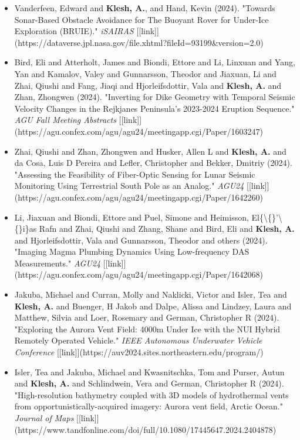 \documentclass[11pt,letterpaper]{article}
\begin{document}
\begin{itemize}
\item Vanderfeen, Edward and \textbf{Klesh, A.}, and Hand, Kevin (2024). "Towards Sonar-Based Obstacle Avoidance for The Buoyant Rover for Under-Ice Exploration (BRUIE)." \textit{iSAIRAS} [[link]](https://dataverse.jpl.nasa.gov/file.xhtml?fileId=93199\&version=2.0)
\item Bird, Eli and Atterholt, James and Biondi, Ettore and Li, Linxuan and Yang, Yan and Kamalov, Valey and Gunnarsson, Theodor and Jiaxuan, Li and Zhai, Qiushi and Fang, Jiaqi and Hjorleifsdottir, Vala and \textbf{Klesh, A.} and Zhan, Zhongwen (2024). "Inverting for Dike Geometry with Temporal Seismic Velocity Changes in the Rejkjanes Peninsula's 2023-2024 Eruption Sequence." \textit{AGU Fall Meeting Abstracts} [[link]](https://agu.confex.com/agu/agu24/meetingapp.cgi/Paper/1603247)
\item Zhai, Qiushi and Zhan, Zhongwen and Husker, Allen L and \textbf{Klesh, A.} and da Cosa, Luis D Pereira and Lefler, Christopher and Bekker, Dmitriy (2024). "Assessing the Feasibility of Fiber-Optic Sensing for Lunar Seismic Monitoring Using Terrestrial South Pole as an Analog." \textit{AGU24} [[link]](https://agu.confex.com/agu/agu24/meetingapp.cgi/Paper/1642260)
\item Li, Jiaxuan and Biondi, Ettore and Puel, Simone and Heimisson, El\{\textbackslash\{\}'\textbackslash\{\}i\}as Rafn and Zhai, Qiushi and Zhang, Shane and Bird, Eli and \textbf{Klesh, A.} and Hjorleifsdottir, Vala and Gunnarsson, Theodor and others (2024). "Imaging Magma Plumbing Dynamics Using Low-frequency DAS Measurements." \textit{AGU24} [[link]](https://agu.confex.com/agu/agu24/meetingapp.cgi/Paper/1642068)
\item Jakuba, Michael and Curran, Molly and Naklicki, Victor and Isler, Tea and \textbf{Klesh, A.} and Buenger, H Jakob and Dalpe, Alissa and Lindzey, Laura and Matthew, Silvia and Loer, Rosemary and German, Christopher R (2024). "Exploring the Aurora Vent Field: 4000m Under Ice with the NUI Hybrid Remotely Operated Vehicle." \textit{IEEE Autonomous Underwater Vehicle Conference} [[link]](https://auv2024.sites.northeastern.edu/program/)
\item Isler, Tea and Jakuba, Michael and Kwasnitschka, Tom and Purser, Autun and \textbf{Klesh, A.} and Schlindwein, Vera and German, Christopher R (2024). "High-resolution bathymetry coupled with 3D models of hydrothermal vents from opportunistically-acquired imagery: Aurora vent field, Arctic Ocean." \textit{Journal of Maps} [[link]](https://www.tandfonline.com/doi/full/10.1080/17445647.2024.2404878)

\end{itemize}
\end{document}
